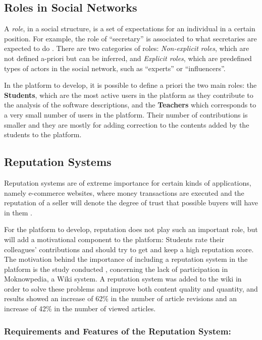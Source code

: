 \documentclass{llncs}
\begin{document}
\subsection{Roles in Social Networks}
A \textit{role}, in a social structure, is a set of expectations for an individual in a certain position. For example, the role of ``secretary'' is associated to what secretaries are expected to do \cite{forestier2012roles,nadel1957theory}. There are two categories of roles: \textit{Non-explicit roles}, which are not defined a-priori but can be inferred, and \textit{Explicit roles}, which are predefined types of actors in the social network, such as ``experts'' or ``influencers''.

In the platform to develop, it is possible to define a priori the two main roles: the \textbf{Students}, which are the most active users in the platform as they contribute to the analysis of the software descriptions, and the \textbf{Teachers} which corresponds to a very small number of users in the platform. Their number of contributions is smaller and they are mostly for adding correction to the contents added by the students to the platform.

\subsection{Reputation Systems}
\label{repsys}
Reputation systems are of extreme importance for certain kinds of applications, namely e-commerce websites, where money transactions are executed and the reputation of a seller will denote the degree of trust that possible buyers will have in them \cite{vavilis2014reference}.

For the platform to develop, reputation does not play such an important role, but will add a motivational component to the platform: Students rate their colleagues' contributions and should try to get and keep a high reputation score. The motivation behind the importance of including a reputation system in the platform is the study conducted \cite{dencheva2011dynamic}, concerning the lack of participation in Moknowpedia, a Wiki system. A reputation system was added to the wiki in order to solve these problems and improve both content quality and quantity\cite{prause2008approach}, and results showed an increase of 62\% in the number of article revisions and an increase of 42\% in the number of viewed articles.
	
\subsubsection{Requirements and Features of the Reputation System:}
\end{document}
